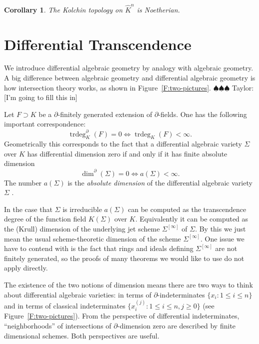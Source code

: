 \documentclass[12pt]{book}
\newcommand{\taylor}[1]{{\color{blue} \sf $\spadesuit\spadesuit\spadesuit$ Taylor: [#1]}}
\numberwithin{equation}{section}
\newtheorem{corollary}[theorem]{Corollary}
\theoremstyle{definition}
\theoremstyle{remark}
\newcommand{\trdeg}{\operatorname{trdeg}}
\begin{document}
\begin{corollary}
	The Kolchin topology on $\widehat{K}^n$ is Noetherian.
\end{corollary}



\section{Differential Transcendence}
We introduce differential algebraic geometry by analogy with algebraic geometry.
A big difference between algebraic geometry and differential algebraic geometry is how intersection theory works, as shown in Figure~\ref{F:two-pictures}.
\taylor{I'm going to fill this in}

Let $F\supset K$ be a $\partial$-finitely generated extension of $\partial$-fields.
One has the following important correspondence:
$$ \trdeg_K^{\partial}(F)=0 \iff \trdeg_K(F)<\infty. $$
Geometrically this corresponds to the fact that a differential algebraic variety $\Sigma$ over $K$ has differential dimension zero if and only if it has finite absolute dimension
$$\dim^{\partial}(\Sigma)=0 \iff a(\Sigma)<\infty.$$ 
The number $a(\Sigma)$ is the \emph{absolute dimension} of the differential algebraic variety $\Sigma$ \cite[\S 2, pg 485]{Buium1993}. 

In the case that $\Sigma$ is irreducible $a(\Sigma)$ can be computed as the transcendence degree of the function field $K(\Sigma)$ over $K$.
Equivalently it can be computed as the (Krull) dimension of the underlying jet scheme $\Sigma^{[\infty]}$ of $\Sigma$.
By this we just mean the usual scheme-theoretic dimension of the scheme $\Sigma^{[\infty]}$. 
One issue we have to contend with is the fact that rings and ideals defining $\Sigma^{[\infty]}$ are not finitely generated, so the proofs of many theorems we would like to use do not apply directly.

The existence of the two notions of dimension means there are two ways to think about differential algebraic varieties: in terms of  $\partial$-indeterminates $\lbrace x_i \colon 1\leq i \leq n \rbrace$ and in terms of classical indeterminates $\lbrace x_i^{(j)} \colon 1\leq i \leq n, j\geq 0 \rbrace$ (see Figure~\ref{F:two-pictures}).
From the perspective of differential indeterminates, ``neighborhoods'' of intersections of $\partial$-dimension zero are described by finite dimensional schemes.
Both perspectives are useful.
\end{document}
